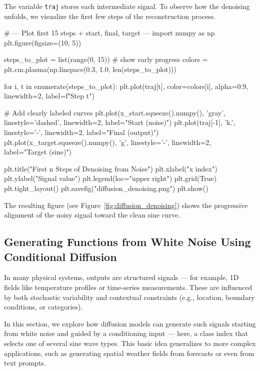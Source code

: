 The variable \texttt{traj} stores each intermediate signal. To observe how the denoising unfolds, we visualize the first few steps of the reconstruction process.

\begin{codeonly}{}
# --- Plot first 15 steps + start, final, target ---
import numpy as np
plt.figure(figsize=(10, 5))

steps_to_plot = list(range(0, 15))  # show early progress
colors = plt.cm.plasma(np.linspace(0.3, 1.0, len(steps_to_plot)))

for i, t in enumerate(steps_to_plot):
    plt.plot(traj[t], color=colors[i], alpha=0.9, linewidth=2, label=f"Step {t}")

# Add clearly labeled curves
plt.plot(x_start.squeeze().numpy(), 'gray', linestyle='dashed', linewidth=2, label="Start (noise)")
plt.plot(traj[-1], 'k.', linestyle='-', linewidth=2, label="Final (output)")
plt.plot(x_target.squeeze().numpy(), 'g', linestyle='-', linewidth=2, label="Target (sine)")

plt.title("First n Steps of Denoising from Noise")
plt.xlabel("x index")
plt.ylabel("Signal value")
plt.legend(loc="upper right")
plt.grid(True)
plt.tight_layout()
plt.savefig("diffusion_denoising.png")
plt.show()
\end{codeonly}

The resulting figure (see Figure~\ref{fig:diffusion_denoising}) shows the progressive alignment of the noisy signal toward the clean sine curve.

%
\subsection{Generating Functions from White Noise Using Conditional Diffusion}

In many physical systems, outputs are structured signals — for example, 1D fields like temperature profiles or time-series measurements. These are influenced by both stochastic variability and contextual constraints (e.g., location, boundary conditions, or categories). 

In this section, we explore how diffusion models can generate such signals starting from white noise and guided by a conditioning input — here, a class index that selects one of several sine wave types. This basic idea generalizes to more complex applications, such as generating spatial weather fields from forecasts or even from text prompts.


